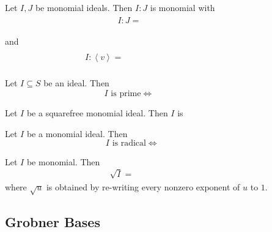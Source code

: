\documentclass[11pt]{article}
\begin{document}
    \rruleline
    
    \begin{prop}{}
        Let $I,J$ be monomial ideals. Then $I:J$ is monomial with
        \begin{equation*}
            I:J = \phantom{\bigcap^{}_{v\in G\left( J \right)} I:\left< v \right>}
        \end{equation*}
        and
        \begin{equation*}
            I:\left< v \right> = \phantom{\left< \frac{u}{\gcd\left( u,v \right)}: u\in G\left( I \right) \right>.}
        \end{equation*}
    \end{prop}

    \rruleline
    
    \begin{prop}{}
        Let $I\subseteq S$ be an ideal. Then
        \begin{equation*}
            \text{$I$ is prime} \iff \phantom{\text{$S /I$ is a domain}}
        \end{equation*}
    \end{prop}

    \rruleline
    
    \begin{prop}{}
        Let $I$ be a squarefree monomial ideal. Then $I$ is 
    \end{prop}

    \begin{cor}{}
        Let $I$ be a monomial ideal. Then
        \begin{equation*}
            \text{$I$ is radical}\iff\phantom{\text{$I$ is squarefree}}
        \end{equation*}
    \end{cor}	

    \rruleline
    
    \begin{theorem}{}
        Let $I$ be monomial. Then
        \begin{equation*}
            \sqrt{I} = \phantom{\left< \sqrt{u}:u\in G\left( I \right) \right>}
        \end{equation*}
        where $\sqrt{u}$ is obtained by re-writing every nonzero exponent of $u$ to $1$.
    \end{theorem}

    \rruleline

    \subsection{Grobner Bases}
    
\end{document}
